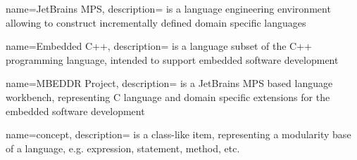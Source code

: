{
  name=JetBrains MPS,
  description={ is a language engineering environment 
  allowing to construct incrementally defined domain specific languages}
}

{
  name=Embedded C++,
  description={ is a language subset of the C++ programming language, intended to
  support embedded software development}
}

{
  name=MBEDDR Project,
  description={ is a JetBrains MPS based language workbench, representing C language and domain specific
  extensions for the embedded software development}
}


{
  name=concept,
  description={ is a class-like item, representing a modularity base of a language, e.g. expression, statement,
  method, etc.}
}

